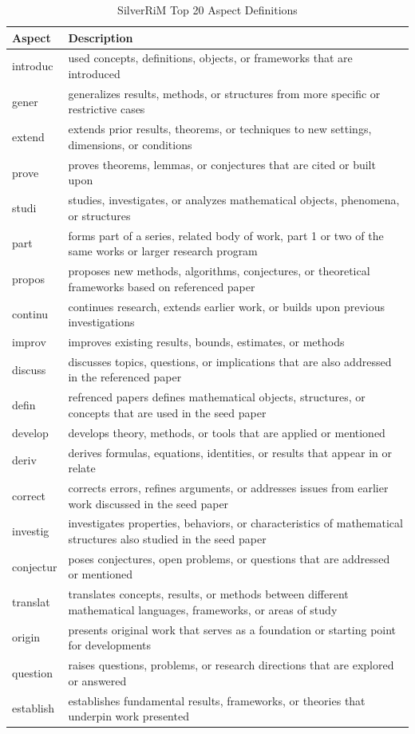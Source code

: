 \documentclass[sigconf,anonymous]{acmart}
\begin{document}
\begin{table}[h]
\centering
\caption{SilverRiM Top 20 Aspect Definitions}
\label{tab:silverrim_aspects}
\small
\begin{tabular}{p{2.5cm}p{12cm}}
\hline
\textbf{Aspect} & \textbf{Description} \\
\hline
introduc & used concepts, definitions, objects, or frameworks that are introduced \\
\hline
gener & generalizes results, methods, or structures from more specific or restrictive cases \\
\hline
extend & extends prior results, theorems, or techniques to new settings, dimensions, or conditions \\
\hline
prove & proves theorems, lemmas, or conjectures that are cited or built upon \\
\hline
studi & studies, investigates, or analyzes mathematical objects, phenomena, or structures \\
\hline
part & forms part of a series, related body of work, part 1 or two of the same works or larger research program \\
\hline
propos & proposes new methods, algorithms, conjectures, or theoretical frameworks based on referenced paper \\
\hline
continu & continues research, extends earlier work, or builds upon previous investigations \\
\hline
improv & improves existing results, bounds, estimates, or methods \\
\hline
discuss & discusses topics, questions, or implications that are also addressed in the referenced paper \\
\hline
defin & refrenced papers defines mathematical objects, structures, or concepts that are used in the seed paper \\
\hline
develop & develops theory, methods, or tools that are applied or mentioned \\
\hline
deriv & derives formulas, equations, identities, or results that appear in or relate \\
\hline
correct & corrects errors, refines arguments, or addresses issues from earlier work discussed in the seed paper \\
\hline
investig & investigates properties, behaviors, or characteristics of mathematical structures also studied in the seed paper \\
\hline
conjectur & poses conjectures, open problems, or questions that are addressed or mentioned \\
\hline
translat & translates concepts, results, or methods between different mathematical languages, frameworks, or areas of study \\
\hline
origin & presents original work that serves as a foundation or starting point for developments \\
\hline
question & raises questions, problems, or research directions that are explored or answered \\
\hline
establish & establishes fundamental results, frameworks, or theories that underpin work presented \\
\hline
\end{tabular}
\end{table}
\end{document}
